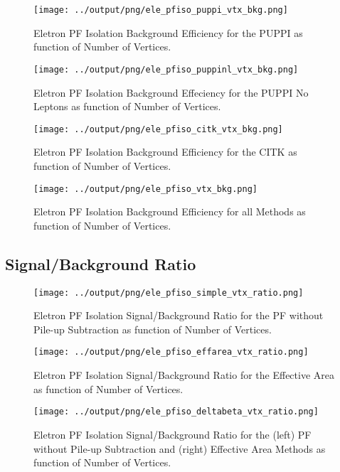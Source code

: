 \documentclass[11pt]{book}
\begin{document}
\begin{figure}[htb]
\centering
\texttt{[image: ../output/png/ele\_pfiso\_puppi\_vtx\_bkg.png]}
\caption{Eletron PF Isolation Background Efficiency for the PUPPI as function of Number of Vertices.}
\label{fig:ele_pfiso_vtx_bgk_puppi}
\end{figure}

\begin{figure}[htb]
\centering
\texttt{[image: ../output/png/ele\_pfiso\_puppinl\_vtx\_bkg.png]}
\caption{Eletron PF Isolation Background Effeciency for the PUPPI No Leptons as function of Number of Vertices.}
\label{fig:ele_pfiso_vtx_bkg_puppinl}
\end{figure}

\begin{figure}[htb]
\centering
\texttt{[image: ../output/png/ele\_pfiso\_citk\_vtx\_bkg.png]}
\caption{Eletron PF Isolation Background Efficiency for the CITK as function of Number of Vertices.}
\label{fig:ele_pfiso_vtx_bkg_citk}
\end{figure}

\begin{figure}[htb]
\centering
\texttt{[image: ../output/png/ele\_pfiso\_vtx\_bkg.png]}
\caption{Eletron PF Isolation Background Efficiency for all Methods as function of Number of Vertices.}
\label{fig:ele_pfiso_vtx_bkg}
\end{figure}
\clearpage

\subsection{Signal/Background Ratio}
\begin{figure}[htb]
\centering
\texttt{[image: ../output/png/ele\_pfiso\_simple\_vtx\_ratio.png]}
\caption{Eletron PF Isolation Signal/Background Ratio for the PF without Pile-up Subtraction as function of Number of Vertices.}
\label{fig:ele_pfiso_vtx_ratio_simple}
\end{figure}

\begin{figure}[htb]
\centering
\texttt{[image: ../output/png/ele\_pfiso\_effarea\_vtx\_ratio.png]}
\caption{Eletron PF Isolation Signal/Background Ratio for the Effective Area as function of Number of Vertices.}
\label{fig:ele_pfiso_vtx_ratio_effarea}
\end{figure}

\begin{figure}[htb]
\centering
\texttt{[image: ../output/png/ele\_pfiso\_deltabeta\_vtx\_ratio.png]}
\caption{Eletron PF Isolation Signal/Background Ratio for the (left) PF without Pile-up Subtraction and (right) Effective Area Methods as function of Number of Vertices.}
\label{fig:ele_pfiso_vtx_ratio_deltabeta}
\end{figure}
\end{document}
